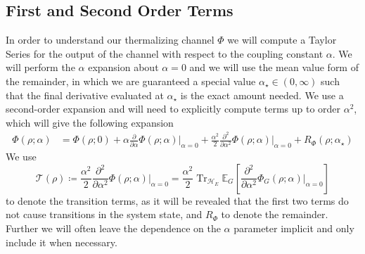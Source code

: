 \documentclass[
 amsmath,amssymb,
 aps,
onecolumn, 
nofootinbib]{revtex4-2}
\DeclareMathOperator{\Tr}{Tr}
\newcommand{\hilb}{\mathcal{H}}
\begin{document}
\subsection{First and Second Order Terms}
In order to understand our thermalizing channel $\Phi$ we will compute a Taylor Series for the output of the channel with respect to the coupling constant $\alpha$. We will perform the $\alpha$ expansion about $\alpha = 0$ and we will use the mean value form of the remainder, in which we are guaranteed a special value $\alpha_{\star} \in (0, \infty)$ such that the final derivative evaluated at $\alpha_{\star}$ is the exact amount needed. We use a second-order expansion and will need to explicitly compute terms up to order $\alpha^2$, which will give the following expansion
\begin{align}
    \Phi(\rho; \alpha) &= \Phi(\rho; 0) + \alpha \frac{\partial}{\partial \alpha} \Phi(\rho; \alpha) \big|_{\alpha = 0} + \frac{\alpha^2}{2} \frac{\partial^2}{\partial \alpha^2} \Phi(\rho; \alpha) \big|_{\alpha = 0} + R_{\Phi}(\rho; \alpha_{\star}) \label{eq:phi_taylor_series}
\end{align}
We use
\begin{equation}
    \mathcal{T}(\rho) \coloneqq \frac{\alpha^2}{2} \frac{\partial^2}{\partial \alpha^2} \Phi(\rho; \alpha) \bigg|_{\alpha = 0} = \frac{\alpha^2}{2}  \Tr_{\hilb_E} \mathbb{E}_{G} \left[\frac{\partial^2}{\partial \alpha^2} \Phi_G(\rho; \alpha) \big|_{\alpha = 0}\right] \label{eq:transition_def}
\end{equation} to denote the transition terms, as it will be revealed that the first two terms do not cause transitions in the system state, and $R_{\Phi}$ to denote the remainder. 
Further we will often leave the dependence on the  $\alpha$ parameter implicit and only include it when necessary.
\end{document}
